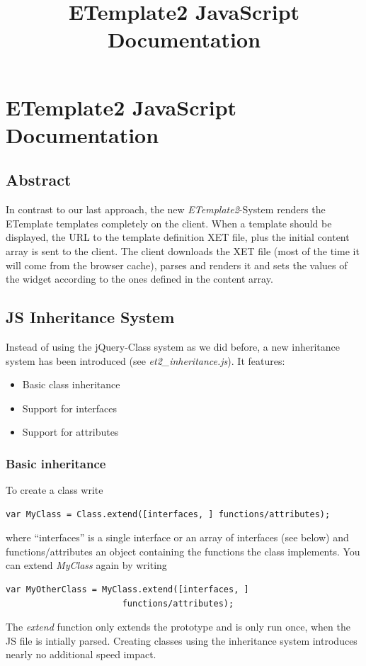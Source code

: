 \documentclass[10pt,a4paper]{report}
\title{ETemplate2 JavaScript Documentation}
\begin{document}
\chapter*{ETemplate2 JavaScript Documentation}

\section*{Abstract}

In contrast to our last approach, the new \textit{ETemplate2}-System renders the ETemplate templates completely on the client. When a template should be displayed, the URL to the template definition XET file, plus the initial content array is sent to the client. The client downloads the XET file (most of the time it will come from the browser cache), parses and renders it and sets the values of the widget according to the ones defined in the content array.

\section*{JS Inheritance System}
Instead of using the jQuery-Class system as we did before, a new inheritance system has been introduced (see \textit{et2\_inheritance.js}). It features:
\begin{itemize}
	\item Basic class inheritance
	\item Support for interfaces
	\item Support for attributes
\end{itemize}

\subsection*{Basic inheritance}

To create a class write
\begin{verbatim}
var MyClass = Class.extend([interfaces, ] functions/attributes);
\end{verbatim}
where ``interfaces'' is a single interface or an array of interfaces (see below) and functions/attributes an object containing the functions the class implements. You can extend \textit{MyClass} again by writing
\begin{verbatim}
var MyOtherClass = MyClass.extend([interfaces, ]
                       functions/attributes);
\end{verbatim}
The \textit{extend} function only extends the prototype and is only run once, when the JS file is intially parsed. Creating classes using the inheritance system introduces nearly no additional speed impact.
\end{document}
